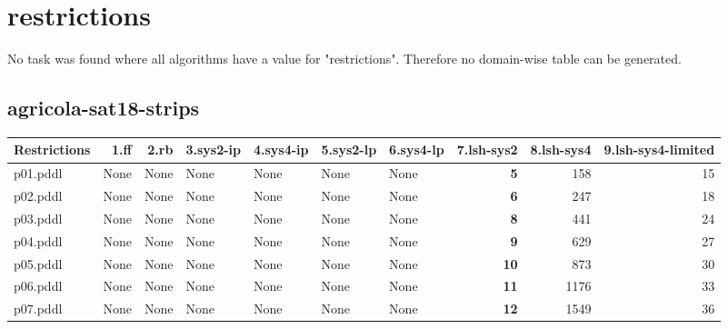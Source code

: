 \documentclass{article}
\begin{document}
\hypertarget{restrictions}{}
\section*{restrictions}

No task was found where all algorithms have a value for "restrictions". Therefore no domain-wise table can be generated.

\hypertarget{restrictions-agricola-sat18-strips}{}
\subsection*{agricola-sat18-strips}

\begin{tabular}{@{}lrrrrrrrrr@{}}
Restrictions & 1.ff & 2.rb & 3.sys2-ip & 4.sys4-ip & 5.sys2-lp & 6.sys4-lp & 7.lsh-sys2 & 8.lsh-sys4 & 9.lsh-sys4-limited \\
\midrule
p01.pddl & \multicolumn{1}{|l|}{None} & \multicolumn{1}{|l|}{None} & \multicolumn{1}{|l|}{None} & \multicolumn{1}{|l|}{None} & \multicolumn{1}{|l|}{None} & \multicolumn{1}{|l|}{None} & \textbf{5} & 158 & 15 \\
p02.pddl & \multicolumn{1}{|l|}{None} & \multicolumn{1}{|l|}{None} & \multicolumn{1}{|l|}{None} & \multicolumn{1}{|l|}{None} & \multicolumn{1}{|l|}{None} & \multicolumn{1}{|l|}{None} & \textbf{6} & 247 & 18 \\
p03.pddl & \multicolumn{1}{|l|}{None} & \multicolumn{1}{|l|}{None} & \multicolumn{1}{|l|}{None} & \multicolumn{1}{|l|}{None} & \multicolumn{1}{|l|}{None} & \multicolumn{1}{|l|}{None} & \textbf{8} & 441 & 24 \\
p04.pddl & \multicolumn{1}{|l|}{None} & \multicolumn{1}{|l|}{None} & \multicolumn{1}{|l|}{None} & \multicolumn{1}{|l|}{None} & \multicolumn{1}{|l|}{None} & \multicolumn{1}{|l|}{None} & \textbf{9} & 629 & 27 \\
p05.pddl & \multicolumn{1}{|l|}{None} & \multicolumn{1}{|l|}{None} & \multicolumn{1}{|l|}{None} & \multicolumn{1}{|l|}{None} & \multicolumn{1}{|l|}{None} & \multicolumn{1}{|l|}{None} & \textbf{10} & 873 & 30 \\
p06.pddl & \multicolumn{1}{|l|}{None} & \multicolumn{1}{|l|}{None} & \multicolumn{1}{|l|}{None} & \multicolumn{1}{|l|}{None} & \multicolumn{1}{|l|}{None} & \multicolumn{1}{|l|}{None} & \textbf{11} & 1176 & 33 \\
p07.pddl & \multicolumn{1}{|l|}{None} & \multicolumn{1}{|l|}{None} & \multicolumn{1}{|l|}{None} & \multicolumn{1}{|l|}{None} & \multicolumn{1}{|l|}{None} & \multicolumn{1}{|l|}{None} & \textbf{12} & 1549 & 36 \\

\end{tabular}
\end{document}

